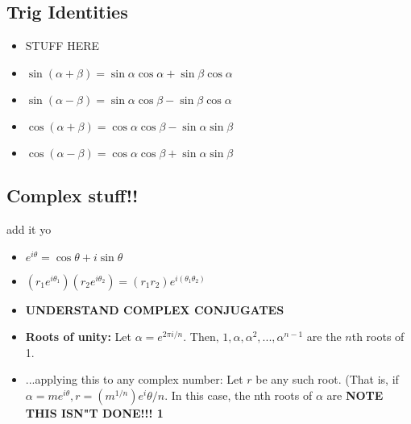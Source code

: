 \documentclass[10pt,letterpaper]{article}
\begin{document}
\subsection*{Trig Identities}
\begin{itemize}
\item STUFF HERE 
\item $\sin (\alpha +\beta )=\sin \alpha \cos \alpha + \sin \beta \cos \alpha$ 
\item $\sin (\alpha - \beta ) = \sin\alpha \cos \beta - \sin \beta \cos \alpha $ 
\item $\cos (\alpha + \beta ) = \cos \alpha \cos \beta - \sin \alpha \sin \beta $ 
\item $\cos (\alpha - \beta ) = \cos \alpha \cos \beta + \sin \alpha \sin \beta $
\end{itemize}

\subsection*{Complex stuff!! }
add it yo 
\begin{itemize}
\item $e^{i\theta}=\cos\theta+i\sin\theta$
\item $(r_1e^{i\theta_1})(r_2e^{i\theta_2})=(r_1r_2)e^{i(\theta_1\theta_2)}$
\item \textbf{UNDERSTAND COMPLEX CONJUGATES }
\item \textbf{Roots of unity:} Let $\alpha = e^{2\pi i/n}. \mbox{ Then, } 1, \alpha, \alpha^2,...,\alpha^{n-1}$ 
are the $n$th roots of 1. 
\item ...applying this to any complex number: Let $r$ be any such root. (That is, if
$\alpha = me^{i\theta}, r=(m^{1/n})e^i\theta/n$. In this case, the nth roots of 
$\alpha$ are \textbf{NOTE THIS ISN"T DONE!!! 1}

\end{itemize}


\iffalse 
#### sources 
* http://inside.mines.edu/fs_home/gmurray/teach/s02/trialSoln.pdf

\fi 
\end{document}
